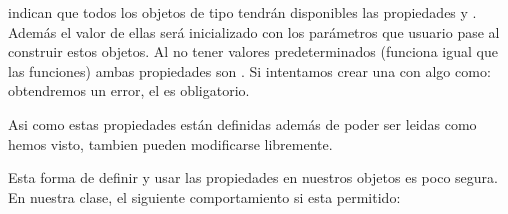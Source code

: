 \documentclass[a5paper,9pt,spanish]{sphinxmanual}
\begin{document}
%
\begin{sphinxVerbatim}[commandchars=\\\{\}]
 
       
          
          
\end{sphinxVerbatim}
\sphinxresetverbatimhllines

\sphinxAtStartPar
indican que todos los objetos de tipo  tendrán disponibles las propiedades
 y . Además el valor de ellas será inicializado con los parámetros
que usuario pase al construir estos objetos.
Al no tener valores predeterminados (funciona igual que las funciones) ambas propiedades
son . Si intentamos crear una  con algo como:
 obtendremos un error, el  es
obligatorio.

\sphinxAtStartPar
Asi como estas propiedades están definidas además de poder ser leidas como hemos visto,
tambien pueden modificarse libremente.

\begin{sphinxVerbatim}[commandchars=\\\{\}]
   
  
\end{sphinxVerbatim}

\sphinxAtStartPar
Esta forma de definir y usar las propiedades en nuestros objetos es poco segura.
En nuestra clase, el siguiente comportamiento si esta permitido:

%
\begin{sphinxVerbatim}[commandchars=\\\{\}]
   
    
\end{sphinxVerbatim}
\sphinxresetverbatimhllines
\end{document}
